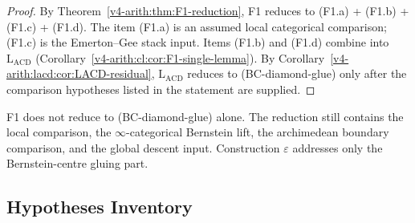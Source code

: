 \begin{proof}
By Theorem~\ref{v4-arith:thm:F1-reduction}, F1 reduces to
(F1.a) + (F1.b) + (F1.c) + (F1.d). The item (F1.a) is an assumed
local categorical comparison; (F1.c) is the Emerton--Gee stack input.
Items (F1.b) and (F1.d) combine into \(\mathrm{L}_{\mathrm{ACD}}\)
(Corollary~\ref{v4-arith:cl:cor:F1-single-lemma}). By
Corollary~\ref{v4-arith:lacd:cor:LACD-residual}, \(\mathrm{L}_{\mathrm{ACD}}\)
reduces to (BC-diamond-glue) only after the comparison hypotheses
listed in the statement are supplied.
\end{proof}

\begin{remark}
\label{v4-arith:lacd:rem:F1-form}
F1 does not reduce to (BC-diamond-glue) alone. The reduction still
contains the local comparison, the \(\infty\)-categorical Bernstein
lift, the archimedean boundary comparison, and the global descent
input. Construction \(\varepsilon\) addresses only the Bernstein-centre
gluing part.
\end{remark}

\subsection{Hypotheses Inventory}

